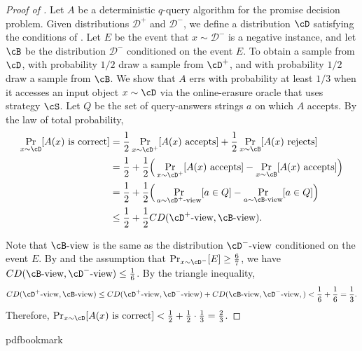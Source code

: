 \documentclass[11pt]{article}
\numberwithin{equation}{section}
\theoremstyle{definition}
\theoremstyle{plain}
\begin{document}
	\begin{proof}[Proof of ]
	Let $A$ be a deterministic $q$-query algorithm for the promise decision problem. Given distributions $\mathcal{D}^+$ and $\mathcal{D}^-$, we define a distribution $\cD$ satisfying the conditions of . Let $E$ be the event that  $x \sim \mathcal{D}^-$ is a negative instance, and let $\cB$ be the distribution $\mathcal{D}^-$ conditioned on the event $E$. To obtain a sample from $\cD$, with probability $1/2$ draw a sample from $\cD^+$, and with probability $1/2$ draw a sample from $\cB$. We show that $A$ errs with probability at least $1/3$ when it accesses an input object $x\sim \cD$ via the online-erasure oracle that uses strategy $\cS$. 	Let $Q$ be the set of query-answers strings $a$ on which $A$ accepts.  By the law of total probability, 
	\begin{align*}
	    \Pr_{x\sim \cD}[A(x) \textnormal{ is correct}] &= \frac{1}{2} \Pr_{x\sim \cD^+}[A(x) \textnormal{ accepts}] + \frac{1}{2} \Pr_{x\sim \cB}[A(x) \textnormal{ rejects}] \\
	    &= \frac{1}{2} + \frac{1}{2}\Big( \Pr_{x\sim \cD^+}[A(x) \textnormal{ accepts}] -  \Pr_{x\sim \cB}[A(x) \textnormal{ accepts}]   \Big) \\
	    &= \frac{1}{2} + \frac{1}{2}\Big( \Pr_{a\sim \cD^+\text{-view}}[a \in Q] -  \Pr_{a\sim \cB\text{-view}}[a \in Q]  \Big) \\
	    &\leq \frac{1}{2} + \frac{1}{2}CD(\cD^+\text{-view}, \cB\text{-view}). 
	\end{align*}
	
	Note that $\cB\text{-view}$ is the same as the distribution $\cD^-\text{-view}$ conditioned on the event $E$. By  and the assumption that $\Pr_{x\sim \cD^-}[E] \geq \frac{6}{7}$, we have $CD(\cB\text{-view}, \cD^-\text{-view}) \leq \frac{1}{6}$. By the triangle inequality, 
	\begin{equation*}
	    CD(\cD^+\text{-view}, \cB\text{-view}) \leq  
	    CD(\cD^+\text{-view}, \cD^-\text{-view}) +  
	    CD(\cB\text{-view}, \cD^-\text{-view},) < \frac{1}{6} + \frac{1}{6} = \frac{1}{3}.
	\end{equation*}
	Therefore, $\Pr_{x\sim \cD}[A(x) \textnormal{ is correct}] < \frac{1}{2} + \frac{1}{2} \cdot \frac{1}{3} = \frac{2}{3}$. 
	\end{proof}
	







\newcommand{\prelim}{Preliminary version in\ }\newcommand{\prelims}{Preliminary
  versions in\ }
\providecommand{\bibhead}[1]{}
\expandafter\ifx\csname pdfbookmark\endcsname\relax%
  \providecommand{\tocrefpdfbookmark}{}
\else\providecommand{\tocrefpdfbookmark}{%
   \hypertarget{tocreferences}{}%
   \pdfbookmark[1]{References}{tocreferences}}%
\fi
\end{document}
